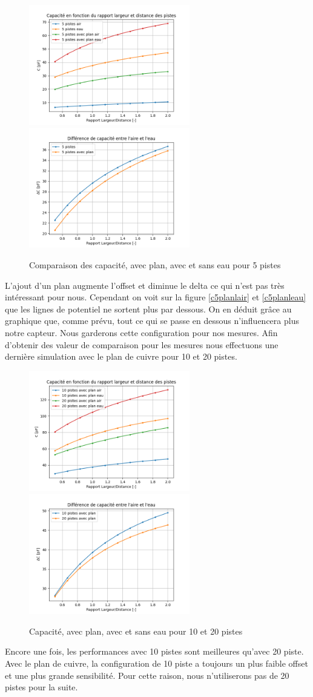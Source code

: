 \begin{figure}[!ht]
 \centering
 \includegraphics[width=7cm]{C5masseGraph1.png}
 \includegraphics[width=7cm]{C5masseGraph2.png}
 \caption{Comparaison des capacité, avec plan, avec et sans eau pour 5 pistes}
\end{figure}

L'ajout d'un plan augmente l'offset et diminue le delta ce qui n'est pas très intéressant pour nous. Cependant on voit sur la figure \ref{c5planlair} et \ref{c5planleau} que les lignes de potentiel ne sortent plus par dessous. On en déduit grâce au graphique que, comme prévu, tout ce qui se passe en dessous n’influencera plus notre capteur. Nous garderons cette configuration pour nos mesures. Afin d'obtenir des valeur de comparaison pour les mesures nous effectuons une dernière simulation avec le plan de cuivre pour 10 et 20 pistes. 

\begin{figure}[!ht]
 \centering
 \includegraphics[width=7cm]{C1020masseGraph1.png}
 \includegraphics[width=7cm]{C1020masseGraph2.png}
 \caption{Capacité, avec plan, avec et sans eau pour 10 et 20 pistes}
\end{figure}

Encore une fois, les performances avec 10 pistes sont meilleures qu'avec 20 piste. Avec le plan de cuivre, la configuration de 10 piste a toujours un plus faible offset et une plus grande sensibilité. Pour cette raison, nous n'utiliserons pas de 20 pistes pour la suite.
